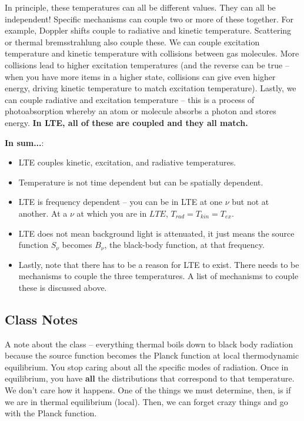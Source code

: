 \documentclass{article}
\begin{document}
In principle, these temperatures can all be different values. They can all be independent! Specific mechanisms can couple two or more of these together. For example, Doppler shifts couple to radiative and kinetic temperature. Scattering or thermal bremsstrahlung also couple these. We can couple excitation temperature and kinetic temperature with collisions between gas molecules. More collisions lead to higher excitation temperatures (and the reverse can be true -- when you have more items in a higher state, collisions can give even higher energy, driving kinetic temperature to match excitation temperature). Lastly, we can couple radiative and excitation temperature -- this is a process of photoabsorption whereby an atom or molecule absorbs a photon and stores energy. \textbf{In LTE, all of these are coupled and they all match.}

\textbf{In sum...}:

\begin{itemize}
    \item LTE couples kinetic, excitation, and radiative temperatures.
    
    \item Temperature is not time dependent but can be spatially dependent. 
    
    \item LTE is frequency dependent -- you can be in LTE at one $\nu$ but not at another. At a $\nu$ at which you are in $LTE$, $T_{rad} = T_{kin} = T_{ex}$. 
    
    \item LTE does not mean background light is attenuated, it just means the source function $S_\nu$ becomes $B_\nu$, the black-body function, at that frequency.
    
    \item Lastly, note that there has to be a reason for LTE to exist. There needs to be mechanisms to couple the three temperatures. A list of mechanisms to couple these is discussed above.
\end{itemize}

\subsection{Class Notes}

A note about the class -- everything thermal boils down to black body radiation because the source function becomes the Planck function at local thermodynamic equilibrium. You stop caring about all the specific modes of radiation. Once in equilibrium, you have \textbf{all} the distributions that correspond to that temperature. We don't care how it happens. One of the things we must determine, then, is if we are in thermal equilibrium (local). Then, we can forget crazy things and go with the Planck function. 
\end{document}
